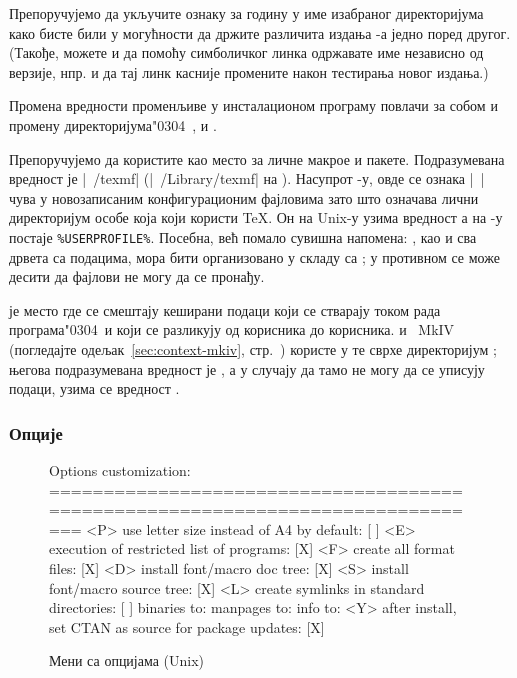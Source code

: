 \documentclass{article}
\begin{document}
Препоручујемо да укључите ознаку за годину у име изабраног
директоријума како бисте били у могућности да држите различита издања
\TL{}-а једно поред другог. (Такође, можете и да помоћу симболичког
линка одржавате име независно од верзије, нпр.
 и да тај линк касније промените
након тестирања новог издања.)

Промена вредности променљиве  у инсталационом
програму повлачи за собом и промену директоријума\char"0304\ 
,  и
.

Препоручујемо да користите  као место за личне
макрое и пакете. Подразумевана вредност је |~/texmf| 
(|~/Library/texmf| на \MacOSX{}). Насупрот
-у, овде се ознака |~| чува у новозаписаним
конфигурационим фајловима зато што означава лични директоријум
особе која који користи \TeX. Он на Unix-у узима вредност
 а на \Windows{}-у постаје \verb|%USERPROFILE%|.
Посебна, већ помало сувишна напомена: , као и
сва дрвета са подацима, мора бити организовано у складу са \TDS{};
у противном се може десити да фајлови не могу да се пронађу.

 је место где се смештају кеширани подаци који се
стварају током рада програма\char"0304\ и који се разликују од
корисника до корисника. \LuaLaTeX{} и \ConTeXt\ MkIV
(погледајте одељак~\ref{sec:context-mkiv},
стр.~\pageref{sec:context-mkiv}) користе у те сврхе
директоријум ; његова подразумевана вредност је
\dirname{TEXMFSYSVAR}, а у случају да тамо не могу да се уписују
подаци, узима се вредност \dirname{TEXMFVAR}.


\subsubsection{Опције}
\label{sec:options}

\begin{figure}[tbh]
\begin{boxedverbatim}
Options customization:
===============================================================================
 <P> use letter size instead of A4 by default:              [ ]
 <E> execution of restricted list of programs:              [X]
 <F> create all format files:                               [X]
 <D> install font/macro doc tree:                           [X]
 <S> install font/macro source tree:                        [X]
 <L> create symlinks in standard directories:               [ ]
            binaries to:
            manpages to:
                info to:
 <Y> after install, set CTAN as source for package updates: [X]
\end{boxedverbatim}
\caption{Мени са опцијама (Unix)}\label{fig:options-text}
\end{figure}
\end{document}
